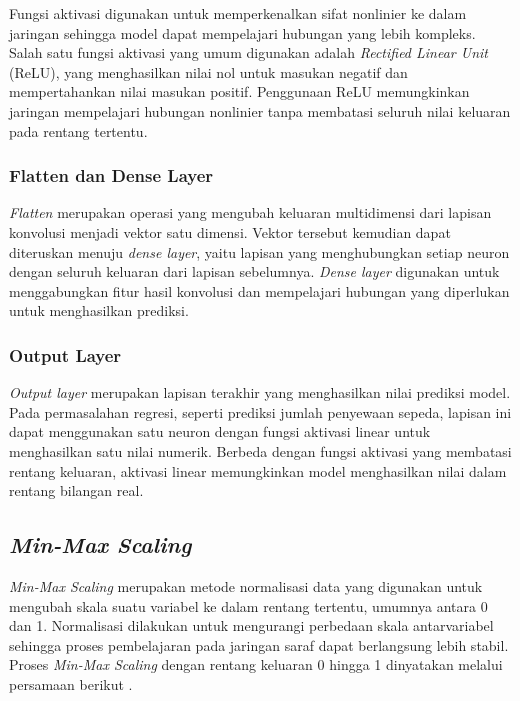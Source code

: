 \documentclass[10pt,conference]{IEEEtran}
\begin{document}
Fungsi aktivasi digunakan untuk memperkenalkan sifat nonlinier ke dalam jaringan sehingga model dapat mempelajari hubungan yang lebih kompleks. Salah satu fungsi aktivasi yang umum digunakan adalah \textit{Rectified Linear Unit} (ReLU), yang menghasilkan nilai nol untuk masukan negatif dan mempertahankan nilai masukan positif. Penggunaan ReLU memungkinkan jaringan mempelajari hubungan nonlinier tanpa membatasi seluruh nilai keluaran pada rentang tertentu.

\subsubsection{Flatten dan Dense Layer}

\textit{Flatten} merupakan operasi yang mengubah keluaran multidimensi dari lapisan konvolusi menjadi vektor satu dimensi. Vektor tersebut kemudian dapat diteruskan menuju \textit{dense layer}, yaitu lapisan yang menghubungkan setiap neuron dengan seluruh keluaran dari lapisan sebelumnya. \textit{Dense layer} digunakan untuk menggabungkan fitur hasil konvolusi dan mempelajari hubungan yang diperlukan untuk menghasilkan prediksi.

\subsubsection{Output Layer}

\textit{Output layer} merupakan lapisan terakhir yang menghasilkan nilai prediksi model. Pada permasalahan regresi, seperti prediksi jumlah penyewaan sepeda, lapisan ini dapat menggunakan satu neuron dengan fungsi aktivasi linear untuk menghasilkan satu nilai numerik. Berbeda dengan fungsi aktivasi yang membatasi rentang keluaran, aktivasi linear memungkinkan model menghasilkan nilai dalam rentang bilangan real.

\subsection{\textit{Min-Max Scaling}}

\textit{Min-Max Scaling} merupakan metode normalisasi data yang digunakan untuk mengubah skala suatu variabel ke dalam rentang tertentu, umumnya antara 0 dan 1. Normalisasi dilakukan untuk mengurangi perbedaan skala antarvariabel sehingga proses pembelajaran pada jaringan saraf dapat berlangsung lebih stabil. Proses \textit{Min-Max Scaling} dengan rentang keluaran 0 hingga 1 dinyatakan melalui persamaan berikut \cite{minmax}.
\end{document}
